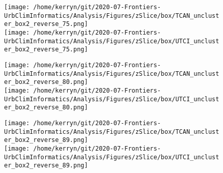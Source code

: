 \documentclass{article}
\begin{document}
\begin{figure} %
\centering    
\texttt{[image: /home/kerryn/git/2020-07-Frontiers-UrbClimInformatics/Analysis/Figures/zSlice/box/TCAN\_uncluster\_box2\_reverse\_75.png]}\\
\texttt{[image: /home/kerryn/git/2020-07-Frontiers-UrbClimInformatics/Analysis/Figures/zSlice/box/UTCI\_uncluster\_box2\_reverse\_75.png]}
\end{figure} 
\clearpage

\begin{figure} %
\centering    
\texttt{[image: /home/kerryn/git/2020-07-Frontiers-UrbClimInformatics/Analysis/Figures/zSlice/box/TCAN\_uncluster\_box2\_reverse\_80.png]}\\
\texttt{[image: /home/kerryn/git/2020-07-Frontiers-UrbClimInformatics/Analysis/Figures/zSlice/box/UTCI\_uncluster\_box2\_reverse\_80.png]}
\end{figure} 
\clearpage


\begin{figure} %
\centering    
\texttt{[image: /home/kerryn/git/2020-07-Frontiers-UrbClimInformatics/Analysis/Figures/zSlice/box/TCAN\_uncluster\_box2\_reverse\_89.png]}\\
\texttt{[image: /home/kerryn/git/2020-07-Frontiers-UrbClimInformatics/Analysis/Figures/zSlice/box/UTCI\_uncluster\_box2\_reverse\_89.png]}
\end{figure} 
\clearpage
\end{document}
